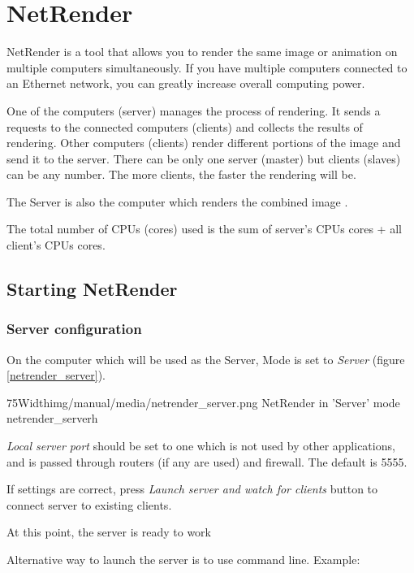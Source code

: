 \section{NetRender}\label{netrender}

NetRender is a tool that allows you to render the same image or animation on
multiple computers simultaneously. If you have multiple computers connected to
an Ethernet network, you can greatly increase overall computing power.

One of the computers (server) manages the process of rendering. It sends a
requests to the connected computers (clients) and collects the results of
rendering. Other computers (clients) render different portions of the image and
send it to the server. There can be only one server (master) but clients
(slaves) can be any number. The more clients, the faster the rendering will be.

The Server is also the computer which renders the combined image .

The total number of CPUs (cores) used is the sum of server's CPUs cores + all
client's CPUs cores.

\subsection{Starting NetRender}\label{starting-netrender}

\subsubsection{Server configuration}\label{server-configuration}

On the computer which will be used as the Server, Mode is set to \emph{Server} (figure \ref{netrender_server}).

\simpleImageWithCaption75Width{img/manual/media/netrender_server.png}
{NetRender in 'Server' mode}
{netrender_server}{h}

\emph{Local server port} should be set to one which is not used by other
applications, and is passed through routers (if any are used) and firewall. The
default is 5555.

If settings are correct, press \emph{Launch server and watch for clients} button
to connect server to existing clients.

At this point, the server is ready to work

Alternative way to launch the server is to use command line. Example:

